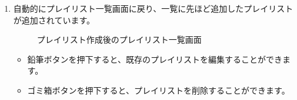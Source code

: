 \begin{enumerate}
            \newpage
            \item 自動的にプレイリスト一覧画面に戻り、一覧に先ほど追加したプレイリストが追加されています。
                \begin{figure}[htbp]
                    \centering
                    \caption{プレイリスト作成後のプレイリスト一覧画面}
                    \label{img:playlist7}
                \end{figure}
                \begin{itemize}
                    \item 鉛筆ボタンを押下すると、既存のプレイリストを編集することができます。
                    \item ゴミ箱ボタンを押下すると、プレイリストを削除することができます。
                \end{itemize}
        \end{enumerate}

    \newpage
